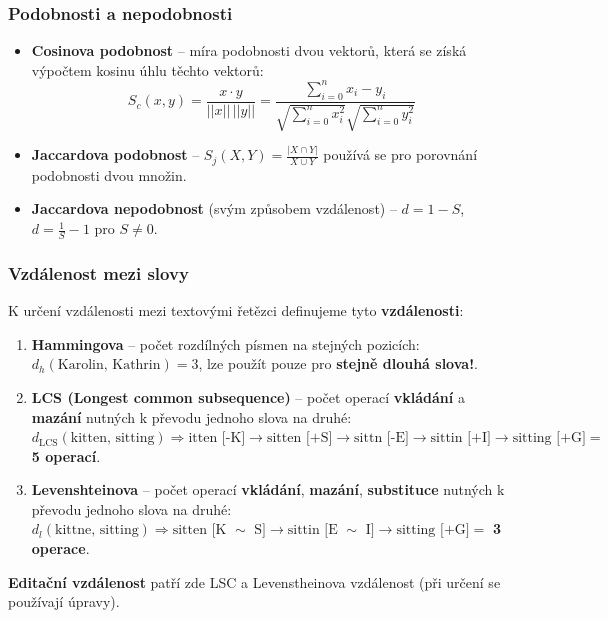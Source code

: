 \subsubsection{Podobnosti a nepodobnosti}
\begin{itemize}
\item \textbf{Cosinova podobnost} -- míra podobnosti dvou vektorů, která se získá výpočtem kosinu úhlu těchto vektorů:
\begin{equation*}
S_c(x, y) = \frac{x \cdot y}{||x|| \, ||y||} = \frac{\sum_{i = 0}^{n} x_i - y_i}{\sqrt{\sum_{i = 0}^{n} x_i^2} \sqrt{\sum_{i = 0}^{n} y_i^2}}
\end{equation*}
\item \textbf{Jaccardova podobnost} -- $S_j(X, Y) = \frac{|X \cap Y|}{X \cup Y}$ používá se pro porovnání podobnosti dvou množin.
\item \textbf{Jaccardova nepodobnost} (svým způsobem vzdálenost) -- $d = 1 - S$, $d = \frac{1}{S} - 1$ pro $S \neq 0$.
\end{itemize}

\subsubsection{Vzdálenost mezi slovy}
K určení vzdálenosti mezi textovými řetězci definujeme tyto \textbf{vzdálenosti}:
\begin{enumerate}
\item \textbf{Hammingova} -- počet rozdílných písmen na stejných pozicích: $d_h(\textrm{Karolin, Kathrin}) = 3$, lze použít pouze pro \textbf{stejně dlouhá slova!}.
\item \textbf{LCS (Longest common subsequence)} -- počet operací \textbf{vkládání} a \textbf{mazání} nutných k převodu jednoho slova na druhé: $d_{\textrm{LCS}	}(\textrm{kitten, sitting}) \Rightarrow \textrm{itten [-K]} \rightarrow \textrm{sitten [+S]} \rightarrow \textrm{sittn [-E]} \rightarrow \textrm{sittin [+I]} \rightarrow \textrm{sitting [+G]} =$ \textbf{5 operací}.
\item \textbf{Levenshteinova} -- počet operací \textbf{vkládání}, \textbf{mazání}, \textbf{substituce}  nutných k převodu jednoho slova na druhé: $d_l(\textrm{kittne, sitting}) \Rightarrow \textrm{sitten [K }\sim \textrm{ S]} \rightarrow \textrm{sittin [E }\sim \textrm{ I]} \rightarrow \textrm{sitting [+G]} =$ \textbf{3 operace}.
\end{enumerate}
\textbf{Editační vzdálenost} patří zde LSC a Levenstheinova vzdálenost (při určení se používají úpravy).

